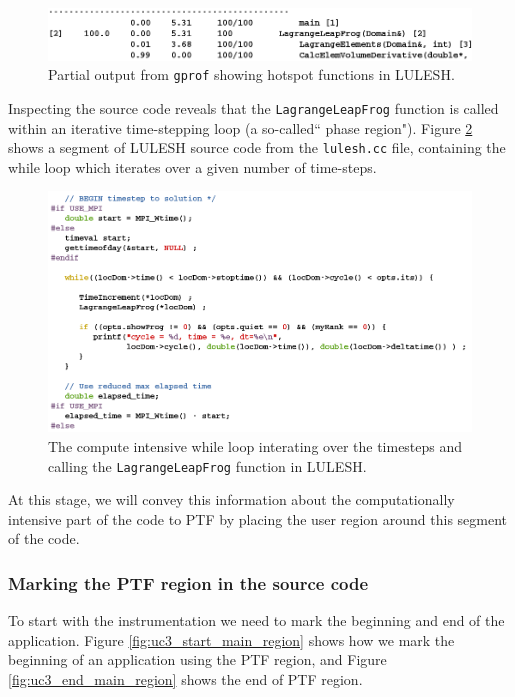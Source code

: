 \begin{figure}[H]
\includegraphics[width=\textwidth]{../BPG/images/uc3_gprof_output.png}
\caption{Partial output from {\tt gprof} showing hotspot functions in LULESH.}
\label{fig:uc3_gprof_output}
\end{figure}
	
Inspecting the source code reveals that the {\tt LagrangeLeapFrog} function is called within an iterative time-stepping loop (a so-called`` phase region"). Figure \ref{fig:uc3_timestep_loop} shows a segment of LULESH source code from the {\tt lulesh.cc} file, containing the while loop which iterates over a given number of time-steps.

\begin{figure}[H]
\includegraphics[width=\textwidth]{../BPG/images/uc3_timestep_loop.png}
\caption{The compute intensive while loop interating over the timesteps and calling the {\tt LagrangeLeapFrog} function in LULESH.}
\label{fig:uc3_timestep_loop}
\end{figure}
	
At this stage, we will convey this information about the computationally intensive part of the code to PTF by placing the user region around this segment of the code.
	
\subsubsection{Marking the PTF region in the source code}

To start with the instrumentation we need to mark the beginning and end of the application. Figure \ref{fig:uc3_start_main_region} shows how we mark the beginning of an application using the PTF region, and Figure \ref{fig:uc3_end_main_region} shows the end of PTF region.

